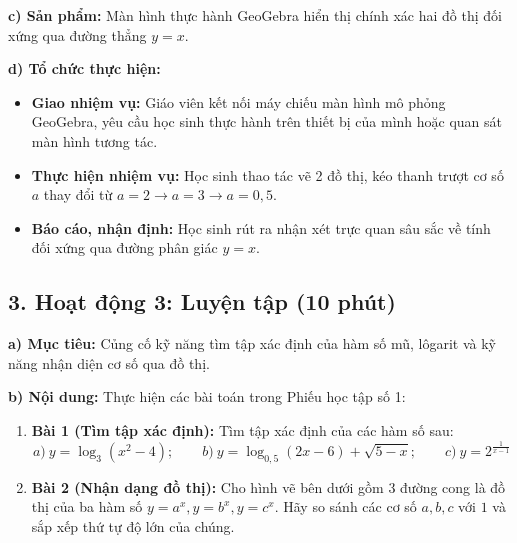 \documentclass[12pt, a4paper]{article}
\begin{document}
\noindent \textbf{c) Sản phẩm:}
Màn hình thực hành GeoGebra hiển thị chính xác hai đồ thị đối xứng qua đường thẳng $y = x$.

\noindent \textbf{d) Tổ chức thực hiện:}
\begin{itemize}[leftmargin=0.6cm]
    \item \textbf{Giao nhiệm vụ:} Giáo viên kết nối máy chiếu màn hình mô phỏng GeoGebra, yêu cầu học sinh thực hành trên thiết bị của mình hoặc quan sát màn hình tương tác.
    \item \textbf{Thực hiện nhiệm vụ:} Học sinh thao tác vẽ 2 đồ thị, kéo thanh trượt cơ số $a$ thay đổi từ $a = 2 \to a = 3 \to a = 0{,}5$.
    \item \textbf{Báo cáo, nhận định:} Học sinh rút ra nhận xét trực quan sâu sắc về tính đối xứng qua đường phân giác $y = x$.
\end{itemize}

\subsection*{3. Hoạt động 3: Luyện tập (10 phút)}

\noindent \textbf{a) Mục tiêu:}
Củng cố kỹ năng tìm tập xác định của hàm số mũ, lôgarit và kỹ năng nhận diện cơ số qua đồ thị.

\noindent \textbf{b) Nội dung:}
Thực hiện các bài toán trong Phiếu học tập số 1:
\begin{enumerate}[leftmargin=0.6cm]
    \item \textbf{Bài 1 (Tìm tập xác định):} Tìm tập xác định của các hàm số sau:
    $$a) \ y = \log_3 (x^2 - 4); \qquad b) \ y = \log_{0{,}5} (2x - 6) + \sqrt{5 - x}; \qquad c) \ y = 2^{\frac{1}{x - 1}}$$
    \item \textbf{Bài 2 (Nhận dạng đồ thị):} Cho hình vẽ bên dưới gồm 3 đường cong là đồ thị của ba hàm số $y = a^x, y = b^x, y = c^x$. Hãy so sánh các cơ số $a, b, c$ với $1$ và sắp xếp thứ tự độ lớn của chúng.
\end{enumerate}
\end{document}
